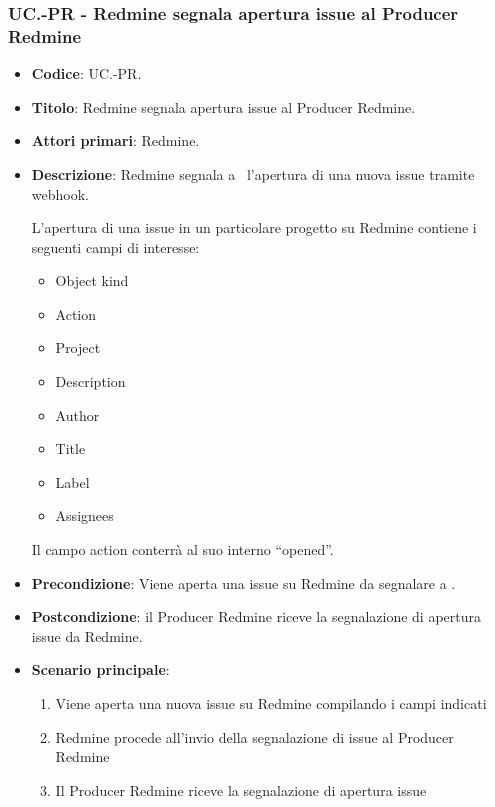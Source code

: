 \subsubsection{UC\theuccount.\thesubuccount-PR - Redmine segnala apertura issue al Producer Redmine}
\begin{itemize}
	\item \textbf{Codice}: UC\theuccount.\thesubuccount-PR.
	\item \textbf{Titolo}: Redmine segnala apertura issue al Producer Redmine.
	\item \textbf{Attori primari}: Redmine.
	\item \textbf{Descrizione}: Redmine segnala a \progetto\ l'apertura di una nuova issue tramite webhook.

	L'apertura di una issue in un particolare progetto su Redmine contiene i seguenti campi di interesse:
	\begin{itemize}
        \item Object kind
        \item Action
        \item Project
        \item Description
        \item Author
        \item Title
        \item Label
        \item Assignees
    \end{itemize}
	Il campo action conterrà al suo interno ``opened''.
	\item \textbf{Precondizione}: Viene aperta una issue su Redmine da
	segnalare a \progetto.
	\item \textbf{Postcondizione}: il Producer Redmine riceve la segnalazione di apertura issue da Redmine.
	\item \textbf{Scenario principale}:
	\begin{enumerate}
		\item Viene aperta una nuova issue su Redmine compilando i campi indicati
		\item Redmine procede all'invio della segnalazione di issue al Producer Redmine
        \item Il Producer Redmine riceve la segnalazione di apertura issue
	\end{enumerate}

\end{itemize}


